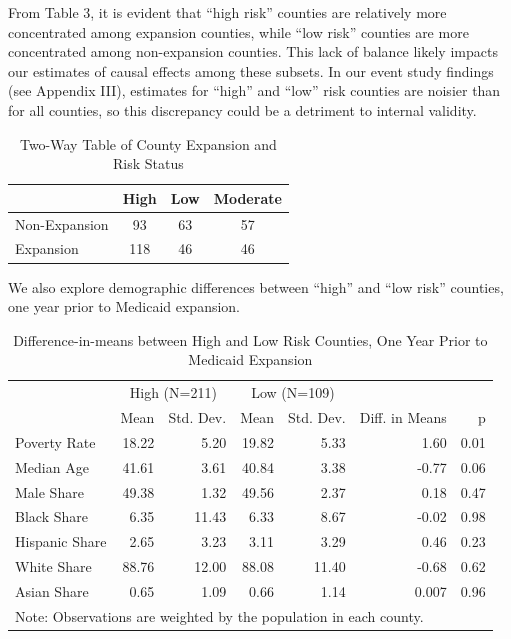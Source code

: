 \documentclass[
  11pt,
]{article}
\begin{document}
From Table 3, it is evident that ``high risk'' counties are relatively
more concentrated among expansion counties, while ``low risk'' counties
are more concentrated among non-expansion counties. This lack of balance
likely impacts our estimates of causal effects among these subsets. In
our event study findings (see Appendix III), estimates for ``high'' and
``low'' risk counties are noisier than for all counties, so this
discrepancy could be a detriment to internal validity.

\begin{table}

\caption{\label{tab:twoway risk expansion}Two-Way Table of County Expansion and Risk Status}
\centering
\begin{tabular}[t]{l|c|c|c}
\hline
  & High & Low & Moderate\\
\hline
Non-Expansion & 93 & 63 & 57\\
\hline
Expansion & 118 & 46 & 46\\
\hline
\end{tabular}
\end{table}

We also explore demographic differences between ``high'' and ``low
risk'' counties, one year prior to Medicaid expansion.

\begin{table}[H]

\caption{\label{tab:diff_in_means_2}Difference-in-means between High and Low Risk Counties, One Year Prior to Medicaid Expansion}
\centering
\begin{tabular}[t]{lrrrrrr}
\toprule
\multicolumn{1}{c}{ } & \multicolumn{2}{c}{High (N=211)} & \multicolumn{2}{c}{Low (N=109)} & \multicolumn{2}{c}{ } \\
\cmidrule(l{3pt}r{3pt}){2-3} \cmidrule(l{3pt}r{3pt}){4-5}
  & Mean & Std. Dev. & Mean & Std. Dev. & Diff. in Means & p\\
\midrule
Poverty Rate & 18.22 & 5.20 & 19.82 & 5.33 & 1.60 & 0.01\\
Median Age & 41.61 & 3.61 & 40.84 & 3.38 & -0.77 & 0.06\\
Male Share & 49.38 & 1.32 & 49.56 & 2.37 & 0.18 & 0.47\\
Black Share & 6.35 & 11.43 & 6.33 & 8.67 & -0.02 & 0.98\\
Hispanic Share & 2.65 & 3.23 & 3.11 & 3.29 & 0.46 & 0.23\\
White Share & 88.76 & 12.00 & 88.08 & 11.40 & -0.68 & 0.62\\
Asian Share & 0.65 & 1.09 & 0.66 & 1.14 & 0.007 & 0.96\\
\bottomrule
\multicolumn{7}{l}{\rule{0pt}{1em}Note: Observations are weighted by the population in each county.}\\
\end{tabular}
\end{table}
\end{document}
